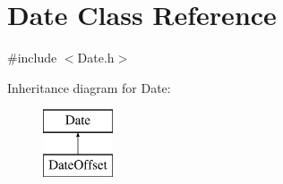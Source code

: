 \hypertarget{class_date}{}\section{Date Class Reference}
\label{class_date}


{\ttfamily \#include $<$Date.\+h$>$}

Inheritance diagram for Date\+:\begin{figure}[H]
\begin{center}
\leavevmode
\includegraphics[height=2.000000cm]{class_date}
\end{center}
\end{figure}
